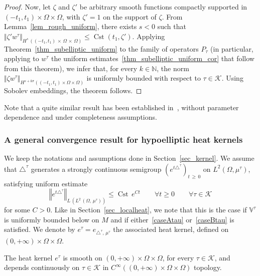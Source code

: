 \documentclass[AHL,Unicode,published]{cedram}
\newcommand*\N{\mathbb{N}}
\newcommand{\bbV}{\mathbb{V}}
\newcommand{\calK}{\mathcal{K}}
\DeclareMathOperator{\Cst}{Cst}
\renewcommand{\geq}{\geqslant}
\renewcommand{\leq}{\leqslant}
\let\oldforall\forall
\renewcommand*{\forall}{\mathrel{\oldforall}}
\begin{document}
\begin{proof}
Now, let $\zeta$ and $\zeta'$ be arbitrary smooth functions compactly supported in $(-t_1,t_1)\times\Omega\times\Omega$, with $\zeta'=1$ on the support of $\zeta$. From Lemma~\ref{lem_rough_uniform}, there exists $s<0$ such that $\Vert \zeta' w^\tau\Vert_{H^s\,((-t_1,t_1)\,\times\,\Omega\,\times\,\Omega)}\leq \Cst(t_1,\zeta')$. Applying Theorem~\ref{thm_subelliptic_uniform} to the family of operators $P_\tau$ (in particular, applying to $w^\tau$ the uniform estimates~\eqref{thm_subelliptic_uniform_cor} that follow from this theorem), we infer that, for every $k\in\N$, the norm $\Vert \zeta w^\tau\Vert_{H^{s+k\sigma}((-t_1,t_1)\times\Omega\times\Omega)}$ is uniformly bounded with respect to $\tau\in\calK$. Using Sobolev embeddings, the theorem follows.
\end{proof}


\begin{rema}
Note that a quite similar result has been established in~\cite{Hsu1995}, without parameter dependence and under completeness assumptions.
\end{rema}



\subsubsection{A general convergence result for hypoelliptic heat kernels}\label{sec_convergence_heat_kernels}
We keep the notations and assumptions done in Section~\ref{sec_kernel}. We assume that $\triangle^\tau$ generates a strongly continuous semigroup $(e^{t\triangle^\tau})_{t\,\geq\,0}$ on $L^2(\Omega,\mu^\tau)$, satisfying uniform estimate
\[
\left\Vert e^{t\triangle^\tau} \right\Vert_{L\,\left(L^2\,(\Omega,\,\mu^\tau)\right)} \leq \Cst\, e^{C t}\qquad \forall t\geq 0\qquad \forall \tau\in\calK
\]
for some $C>0$. Like in Section~\ref{sec_localheat}, we note that this is the case if $\bbV^\tau$ is uniformly bounded below on $M$ and if either~\ref{caseAtau} or~\ref{caseBtau} is satisfied. We denote by $e^\tau=e_{\triangle^\tau,\,\mu^\tau}$ the associated heat kernel, defined on $(0,+\infty)\times\Omega\times\Omega$.


\begin{theo}\label{thm_CV_general1}
The heat kernel $e^\tau$ is smooth on $(0,+\infty)\times\Omega\times\Omega$, for every $\tau\in\calK$, and depends continuously on $\tau\in\calK$ in $C^\infty((0,+\infty)\times\Omega\times\Omega)$ topology.
\end{theo}
\end{document}
